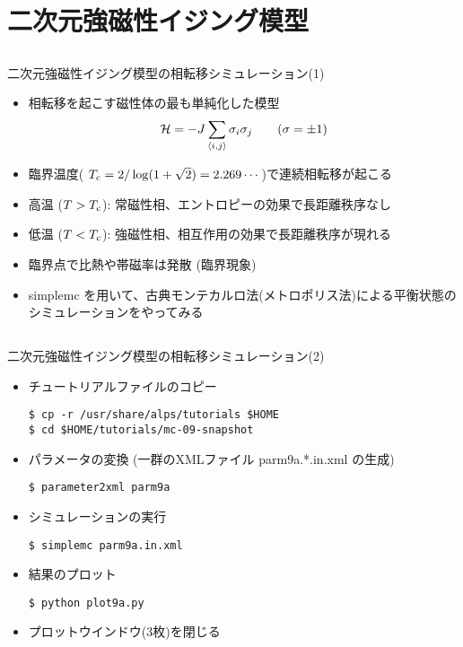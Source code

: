 \section{二次元強磁性イジング模型}

\subsection*{\redb\whiteb\greenm}
\begin{frame}[t,fragile]{二次元強磁性イジング模型の相転移シミュレーション(1)}
  \begin{itemize}
  \item 相転移を起こす磁性体の最も単純化した模型
    \[
      {\cal H} = - J \sum_{\langle i,j \rangle} \sigma_i \sigma_j \qquad (\sigma = \pm 1)
      \]
    \item 臨界温度( $T_{\rm c} = 2/\log(1+\sqrt{2}) = 2.269\cdots$)で連続相転移が起こる
    \item 高温 ($T > T_{\rm c}$): 常磁性相、エントロピーの効果で長距離秩序なし
    \item 低温 ($T < T_{\rm c}$): 強磁性相、相互作用の効果で長距離秩序が現れる
    \item 臨界点で比熱や帯磁率は発散 (臨界現象)
    \item simplemc を用いて、古典モンテカルロ法(メトロポリス法)による平衡状態のシミュレーションをやってみる
  \end{itemize}
\end{frame}

\subsection*{\redb\whiteb\greenm}
\begin{frame}[t,fragile]{二次元強磁性イジング模型の相転移シミュレーション(2)}
  \begin{itemize}
  \item チュートリアルファイルのコピー
\begin{lstlisting}
$ cp -r /usr/share/alps/tutorials $HOME
$ cd $HOME/tutorials/mc-09-snapshot
\end{lstlisting}
  \item パラメータの変換 (一群のXMLファイル parm9a.*.in.xml の生成)
\begin{lstlisting}
$ parameter2xml parm9a
\end{lstlisting}
  \item シミュレーションの実行
\begin{lstlisting}
$ simplemc parm9a.in.xml
\end{lstlisting}
\item 結果のプロット
\begin{lstlisting}
$ python plot9a.py
\end{lstlisting}
\item プロットウインドウ(3枚)を閉じる
  \end{itemize}
\end{frame}

